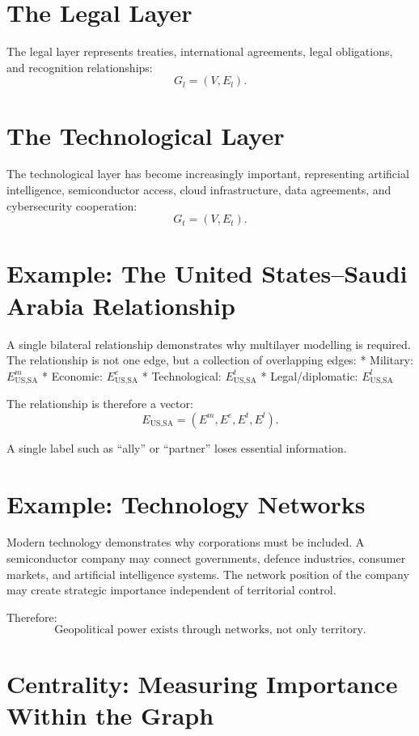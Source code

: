 \documentclass[11pt,openany]{book}
\theoremstyle{plain}
\theoremstyle{definition}
\begin{document}
\section*{The Legal Layer}

The legal layer represents treaties, international agreements, legal obligations, and recognition relationships:
\[
G_l = (V, E_l).
\]

\section*{The Technological Layer}

The technological layer has become increasingly important, representing artificial intelligence, semiconductor access, cloud infrastructure, data agreements, and cybersecurity cooperation:
\[
G_t = (V, E_t).
\]

\section*{Example: The United States–Saudi Arabia Relationship}

A single bilateral relationship demonstrates why multilayer modelling is required. The relationship is not one edge, but a collection of overlapping edges:
* Military: \(E_{\text{US,SA}}^m\)
* Economic: \(E_{\text{US,SA}}^e\)
* Technological: \(E_{\text{US,SA}}^t\)
* Legal/diplomatic: \(E_{\text{US,SA}}^l\)

The relationship is therefore a vector:
\[
E_{\text{US,SA}} = (E^m, E^e, E^t, E^l).
\]

A single label such as ``ally'' or ``partner'' loses essential information.

\section*{Example: Technology Networks}

Modern technology demonstrates why corporations must be included. A semiconductor company may connect governments, defence industries, consumer markets, and artificial intelligence systems. The network position of the company may create strategic importance independent of territorial control.

Therefore:
\[
\boxed{
\text{Geopolitical power exists through networks, not only territory.}
}
\]

\section*{Centrality: Measuring Importance Within the Graph}
\end{document}
